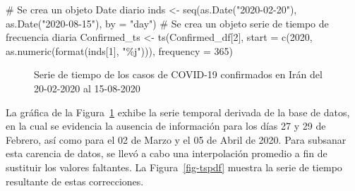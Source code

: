 \documentclass[
  us-letterpaper,
]{scrreprt}
\newenvironment{Shaded}{\begin{snugshade}}{\end{snugshade}}
\newcommand{\AttributeTok}[1]{\textcolor[rgb]{0.40,0.45,0.13}{#1}}
\newcommand{\CommentTok}[1]{\textcolor[rgb]{0.37,0.37,0.37}{#1}}
\newcommand{\DecValTok}[1]{\textcolor[rgb]{0.68,0.00,0.00}{#1}}
\newcommand{\FunctionTok}[1]{\textcolor[rgb]{0.28,0.35,0.67}{#1}}
\newcommand{\NormalTok}[1]{\textcolor[rgb]{0.00,0.23,0.31}{#1}}
\newcommand{\OtherTok}[1]{\textcolor[rgb]{0.00,0.23,0.31}{#1}}
\newcommand{\StringTok}[1]{\textcolor[rgb]{0.13,0.47,0.30}{#1}}
\theoremstyle{definition}
\theoremstyle{plain}
\theoremstyle{plain}
\theoremstyle{definition}
\theoremstyle{remark}
\begin{document}
\begin{Shaded}
\begin{Highlighting}[]
\CommentTok{\# Se crea un objeto \textquotesingle{}Date\textquotesingle{} diario}
\NormalTok{inds }\OtherTok{\textless{}{-}} \FunctionTok{seq}\NormalTok{(}\FunctionTok{as.Date}\NormalTok{(}\StringTok{"2020{-}02{-}20"}\NormalTok{), }\FunctionTok{as.Date}\NormalTok{(}\StringTok{"2020{-}08{-}15"}\NormalTok{), }\AttributeTok{by =} \StringTok{"day"}\NormalTok{)}
\CommentTok{\# Se crea un objeto \textquotesingle{}serie de tiempo\textquotesingle{} de frecuencia diaria}
\NormalTok{Confirmed\_ts }\OtherTok{\textless{}{-}} \FunctionTok{ts}\NormalTok{(Confirmed\_df[}\DecValTok{2}\NormalTok{], }
                   \AttributeTok{start =} \FunctionTok{c}\NormalTok{(}\DecValTok{2020}\NormalTok{, }\FunctionTok{as.numeric}\NormalTok{(}\FunctionTok{format}\NormalTok{(inds[}\DecValTok{1}\NormalTok{], }\StringTok{"\%j"}\NormalTok{))),}
                   \AttributeTok{frequency =} \DecValTok{365}\NormalTok{)}
\end{Highlighting}
\end{Shaded}

\begin{figure}


\caption{\label{fig-oripdf}Serie de tiempo de los casos de COVID-19
confirmados en Irán del 20-02-2020 al 15-08-2020}

\end{figure}%

La gráfica de la Figura~\ref{fig-oripdf} exhibe la serie temporal
derivada de la base de datos, en la cual se evidencia la ausencia de
información para los días 27 y 29 de Febrero, así como para el 02 de
Marzo y el 05 de Abril de 2020. Para subsanar esta carencia de datos, se
llevó a cabo una interpolación promedio a fin de sustituir los valores
faltantes. La Figura~\ref{fig-tspdf} muestra la serie de tiempo
resultante de estas correcciones.
\end{document}
